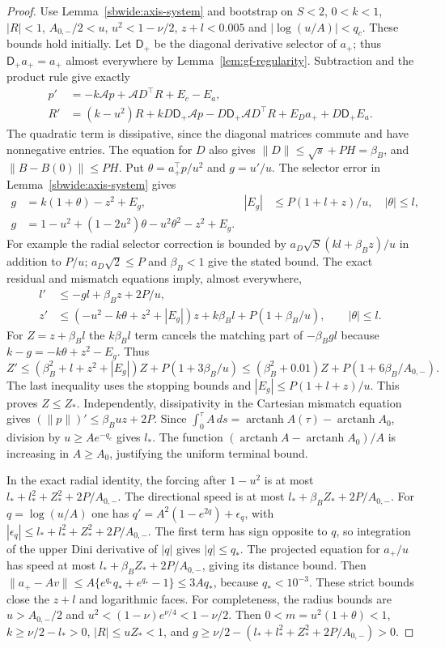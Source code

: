 \documentclass[10pt]{article}
\theoremstyle{remark}\newtheorem{remark}[theorem]{Remark}
\begin{document}
\begin{proof}
Use Lemma~\ref{sbwide:axis-system} and bootstrap on
$S<2$, $0<k<1$, $|R|<1$, $A_{0,-}/2<u$, $u^2<1-\nu/2$,
$z+l<0.005$ and $|\log(u/A)|<q_c$. These bounds hold initially.
Let $\mathsf D_+$ be the diagonal derivative selector of $a_+$; thus
$\mathsf D_+ a_+=a_+$ almost everywhere by
Lemma~\ref{lem:gf-regularity}. Subtraction and the product rule give exactly
\begin{align*}
 p'&=-k\mathcal A p+\mathcal A D^\top R+E_c-E_a,\\
 R'&=(k-u^2)R+kD\mathsf D_+\mathcal A p
       -D\mathsf D_+\mathcal A D^\top R+E_Da_++D\mathsf D_+ E_a.
\end{align*}
The quadratic term is dissipative, since the diagonal matrices commute
and have nonnegative entries. The equation for $D$ also gives
$\|D\|\le\sqrt s+PH=\beta_B$, and $\|B-B(0)\|\le PH$.
Put $\theta=a_+^\top p/u^2$ and $g=u'/u$.
The selector error in Lemma~\ref{sbwide:axis-system} gives
\begin{align*}
 g&=k(1+\theta)-z^2+E_g,
 &|E_g|&\le P(1+l+z)/u,\quad |\theta|\le l,\\
 g&=1-u^2+(1-2u^2)\theta-u^2\theta^2-z^2+E_g.
\end{align*}
For example the radial selector correction is bounded by
$a_D\sqrt S(k l+\beta_Bz)/u$ in addition to $P/u$;
$a_D\sqrt2\le P$ and $\beta_B<1$ give the stated bound.
The exact residual and mismatch equations imply, almost everywhere,
\begin{align*}
 l'&\le-gl+\beta_Bz+2P/u,\\
 z'&\le(-u^2-k\theta+z^2+|E_g|)z
                    +k\beta_Bl+P(1+\beta_B/u),
 \qquad |\theta|\le l.
\end{align*}
For $Z=z+\beta_Bl$ the $k\beta_Bl$ term cancels the matching part of
$-\beta_Bgl$ because $k-g=-k\theta+z^2-E_g$. Thus
\[
 Z'\le(\beta_B^2+l+z^2+|E_g|)Z+P(1+3\beta_B/u)
 \le(\beta_B^2+0.01)Z+P(1+6\beta_B/A_{0,-}).
\]
The last inequality uses the stopping bounds and
$|E_g|\le P(1+l+z)/u$. This proves $Z\le Z_*$.
Independently, dissipativity in the Cartesian mismatch equation gives
$(\|p\|)'\le\beta_Buz+2P$. Since
$\int_0^\tau A\,ds=\operatorname{arctanh}A(\tau)
-\operatorname{arctanh}A_0$, division by $u\ge Ae^{-q_c}$ gives $l_*$.
The function $(\operatorname{arctanh}A-\operatorname{arctanh}A_0)/A$
is increasing in $A\ge A_0$, justifying the uniform terminal bound.

In the exact radial identity, the forcing after $1-u^2$ is at most
$l_*+l_*^2+Z_*^2+2P/A_{0,-}$. The directional speed is at most
$l_*+\beta_BZ_*+2P/A_{0,-}$. For $q=\log(u/A)$ one has
$q'=A^2(1-e^{2q})+\epsilon_q$, with
$|\epsilon_q|\le l_*+l_*^2+Z_*^2+2P/A_{0,-}$.
The first term has sign opposite to $q$, so integration of the upper
Dini derivative of $|q|$ gives $|q|\le q_*$.
The projected equation for $a_+/u$ has speed at most
$l_*+\beta_B Z_*+2P/A_{0,-}$, giving its distance bound.
Then $\|a_+-Av\|\le A\{e^{q_*}q_*+e^{q_*}-1\}\le3Aq_*$,
because $q_*<10^{-3}$. 
These strict bounds close the $z+l$ and logarithmic faces.
For completeness, the radius bounds are
$u>A_{0,-}/2$ and $u^2<(1-\nu)e^{\nu/4}<1-\nu/2$.
Then $0<m=u^2(1+\theta)<1$, $k\ge\nu/2-l_*>0$,
$|R|\le uZ_*<1$, and
$g\ge\nu/2-(l_*+l_*^2+Z_*^2+2P/A_{0,-})>0$.


\end{proof}
\end{document}
